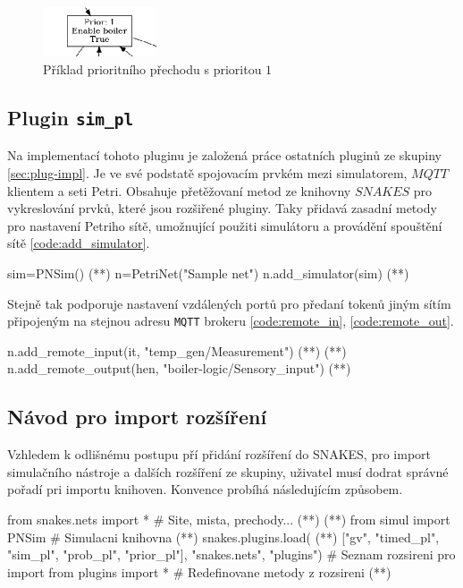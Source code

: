 \begin{figure}[hbt]
  \centering
  \includegraphics[width=0.3\textwidth]{obrazky-figures/prior-transition.png}
  \caption{Příklad prioritního přechodu s prioritou $1$}
  \label{prior-transition}
\end{figure}

\subsection{Plugin \texttt{sim\_pl}}
\label{subsec:aplikace-mqtt}
Na implementací tohoto pluginu je založená práce ostatních pluginů ze skupiny \ref{sec:plug-impl}. Je ve své podstatě spojovacím prvkém mezi simulatorem, $MQTT$ klientem a seti Petri. Obsahuje přetěžovaní metod ze knihovny $SNAKES$ pro vykreslování prvků, které jsou rozšiřené pluginy. Taky přidavá zasadní metody pro nastavení Petriho sítě, umožnující použiti simulátoru a provádění spouštění sítě \ref{code:add_simulator}.
\begin{python}
  sim=PNSim() (*\label{code:sim-add}*)
  n=PetriNet("Sample net")
  n.add_simulator(sim) (*\label{code:add_simulator}*)
\end{python}

Stejně tak podporuje nastavení vzdálených portů pro předaní tokenů jiným sítím připojeným na stejnou adresu \texttt{MQTT} brokeru \ref{code:remote_in}, \ref{code:remote_out}.

\begin{python}
  n.add_remote_input(it, "temp_gen/Measurement") (*\label{code:remote_in}*) (*\label{code:remote-in-out}*)
  n.add_remote_output(hen, "boiler-logic/Sensory_input") (*\label{code:remote_out}*)
\end{python}

\subsection{Návod pro import rozšíření}
Vzhledem k odlišnému postupu pří přidání rozšíření do SNAKES, pro import simulačního nástroje a dalších rozšíření ze skupiny, uživatel musí dodrat správné pořadí pri importu knihoven. Konvence probíhá následujícím způsobem.

\begin{python}
  from snakes.nets import *   # Site, mista, prechody... (*\label{code:snakes-all}*) (*\label{code:plugin-setup}*)
  from simul import PNSim     # Simulacni knihovna (*\label{code:pnsim}*)
  snakes.plugins.load( (*\label{code:sim-plugins}*)
    ["gv", "timed_pl", "sim_pl", "prob_pl", "prior_pl"],
    "snakes.nets",
    "plugins") # Seznam rozsireni pro import
  from plugins import * # Redefinovane metody z rozsireni (*\label{code:pl-import}*)
\end{python}

